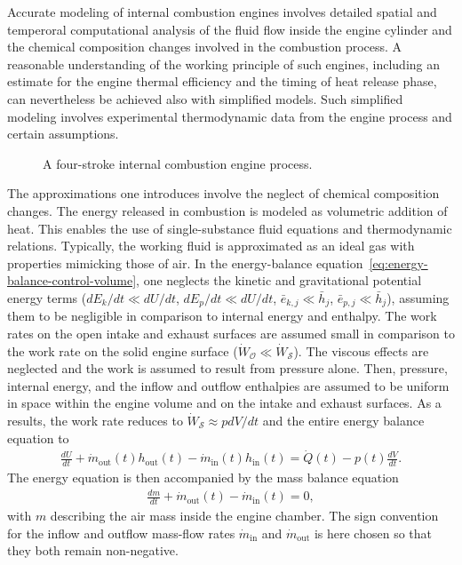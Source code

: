 Accurate modeling of internal combustion engines involves detailed spatial and temperoral computational analysis of the fluid flow inside the engine cylinder and the chemical composition changes involved in the combustion process. A reasonable understanding of the working principle of such engines, including an estimate for the engine thermal efficiency and the timing of heat release phase, can nevertheless be achieved also with simplified models. Such simplified modeling involves experimental thermodynamic data from the engine process and certain assumptions. 
\begin{figure}[!htb]
    \centering
    
    \caption{A four-stroke internal combustion engine process.}
    \label{fig:internal-combustion-engine}
\end{figure}

The approximations one introduces involve the neglect of chemical composition changes. The energy released in combustion is modeled as volumetric addition of heat. This enables the use of single-substance fluid equations and thermodynamic relations. Typically, the working fluid is approximated as an ideal gas with properties mimicking those of air. In the energy-balance equation~\eqref{eq:energy-balance-control-volume}, one neglects the kinetic and gravitational potential energy terms ($dE_k/dt\ll dU/dt$, $dE_p/dt\ll dU/dt$, $\bar{e}_{k,j}\ll\bar{h}_{j}$, $\bar{e}_{p,j}\ll\bar{h}_{j}$), assuming them to be negligible in comparison to internal energy and enthalpy. The work rates on the open intake and exhaust surfaces are assumed small in comparison to the work rate on the solid engine surface ($\dot{W}_{\mathcal{O}}\ll\dot{W}_{\mathcal{S}}$). The viscous effects are neglected and the work is assumed to result from pressure alone. Then, pressure, internal energy, and the inflow and outflow enthalpies are assumed to be uniform in space within the engine volume and on the intake and exhaust surfaces. As a results, the work rate reduces to $\dot{W}_{\mathcal{S}}\approx pdV/dt$ and the entire energy balance equation to
\begin{align}
    \frac{dU}{dt}+\dot{m}_\text{out}(t)h_\text{out}(t)-\dot{m}_\text{in}(t)h_\text{in}(t)=\dot{Q}(t)-p(t)\frac{dV}{dt}.
\end{align}
The energy equation is then accompanied by the mass balance equation
\begin{align}
    \frac{dm}{dt}+\dot{m}_\text{out}(t)-\dot{m}_\text{in}(t)=0,
\end{align}
with $m$ describing the air mass inside the engine chamber. The sign convention for the inflow and outflow mass-flow rates $\dot{m}_\text{in}$ and $\dot{m}_\text{out}$ is here chosen so that they both remain non-negative.

